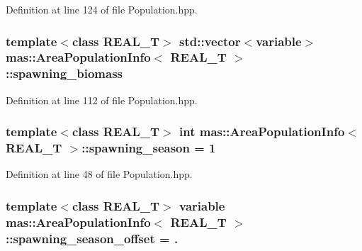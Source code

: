 Definition at line 124 of file Population.\-hpp.

\hypertarget{structmas_1_1_area_population_info_a88242109e6eece96d7612b16aaaad5cd}{
\subsubsection[{spawning\-\_\-biomass}]{\setlength{\rightskip}{0pt plus 5cm}template$<$class R\-E\-A\-L\-\_\-\-T$>$ std\-::vector$<${\bf variable}$>$ {\bf mas\-::\-Area\-Population\-Info}$<$ R\-E\-A\-L\-\_\-\-T $>$\-::spawning\-\_\-biomass}}\label{structmas_1_1_area_population_info_a88242109e6eece96d7612b16aaaad5cd}


Definition at line 112 of file Population.\-hpp.

\hypertarget{structmas_1_1_area_population_info_a777033e8de0e61461394edc007a12e90}{
\subsubsection[{spawning\-\_\-season}]{\setlength{\rightskip}{0pt plus 5cm}template$<$class R\-E\-A\-L\-\_\-\-T$>$ int {\bf mas\-::\-Area\-Population\-Info}$<$ R\-E\-A\-L\-\_\-\-T $>$\-::spawning\-\_\-season = 1}}\label{structmas_1_1_area_population_info_a777033e8de0e61461394edc007a12e90}


Definition at line 48 of file Population.\-hpp.

\hypertarget{structmas_1_1_area_population_info_aa8014e9618bcf75fdf503c0d8983590b}{
\subsubsection[{spawning\-\_\-season\-\_\-offset}]{\setlength{\rightskip}{0pt plus 5cm}template$<$class R\-E\-A\-L\-\_\-\-T$>$ {\bf variable} {\bf mas\-::\-Area\-Population\-Info}$<$ R\-E\-A\-L\-\_\-\-T $>$\-::spawning\-\_\-season\-\_\-offset = .}}\label{structmas_1_1_area_population_info_aa8014e9618bcf75fdf503c0d8983590b}


